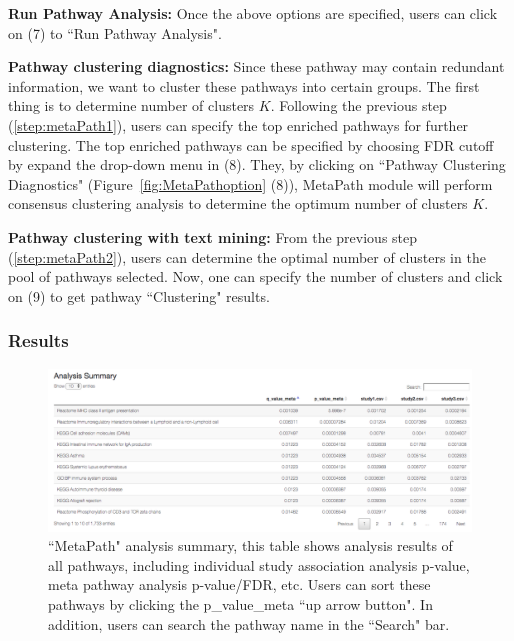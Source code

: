 \begin{steps}
\item \textbf{Run Pathway Analysis:}
\label{step:metaPath1}
Once the above options are specified, users can click on {\color{red}(7)} to ``Run Pathway Analysis".

\item \textbf{Pathway clustering diagnostics:} 
\label{step:metaPath2}
Since these pathway may contain redundant information, 
we want to cluster these pathways into certain groups. 
The first thing is to determine number of clusters $K$.
Following the previous step (\ref{step:metaPath1}), 
users can specify the top enriched pathways for further clustering. 
The top enriched pathways can be specified by choosing FDR cutoff by expand the drop-down menu in {\color{red}(8)}.
They, by clicking on ``Pathway Clustering Diagnostics" (Figure~\ref{fig:MetaPathoption} {\color{red}(8)}),
MetaPath module will perform consensus clustering analysis to determine the optimum number of clusters $K$.


\item \textbf{Pathway clustering with text mining:} 
\label{step:metaPath3}
From the previous step (\ref{step:metaPath2}), users can determine the optimal number of clusters in the pool of pathways selected. 
Now, one can specify the number of clusters and click on {\color{red}(9)} to get pathway ``Clustering" results. 
\end{steps}




\subsubsection{Results}

\begin{figure}[H]
\begin{center}
\includegraphics[scale=0.4]{./figure/metaPath/metaPathresult1.png}
\caption{``MetaPath" analysis summary, 
this table shows analysis results of all pathways, 
including individual study association analysis p-value, meta pathway analysis p-value/FDR, etc. 
Users can sort these pathways by clicking the p\_value\_meta ``up arrow button".
In addition, users can search the pathway  name in the ``Search" bar.
}
\label{fig:MetaPathresult1}
\end{center}
\end{figure}

